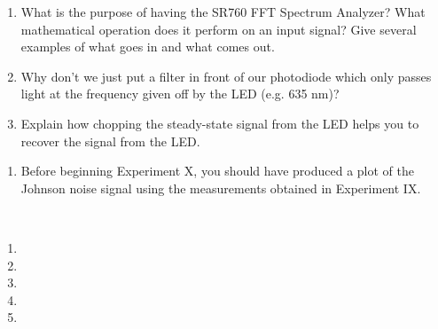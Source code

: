 \documentclass{../signatures}
\begin{document}
\maketitle

\names

\prelab

\begin{enumerate}

    \item What is the purpose of having the SR760 FFT Spectrum Analyzer? What mathematical operation does it perform on an input signal? Give several examples of what goes in and what comes out.
    
    \item Why don’t we just put a filter in front of our photodiode which only passes light at the frequency given off by the LED (e.g. 635 nm)?

    \item Explain how chopping the steady-state signal from the LED helps you to recover the signal from the LED.
       \\[36pt]
\end{enumerate}

\prelabsignatures

\midlab

\begin{enumerate}

    \item Before beginning Experiment X, you should have produced a plot of the Johnson noise signal using the measurements obtained in Experiment IX.
\\[36pt]
\end{enumerate}

\midlabsignaturesLLS
\newpage
\checkpointsection 
\\[12pt]
\begin{enumerate}

\item {}

\item {}

\item {}

\item {}

\item {}

\end{enumerate}
\end{document}
